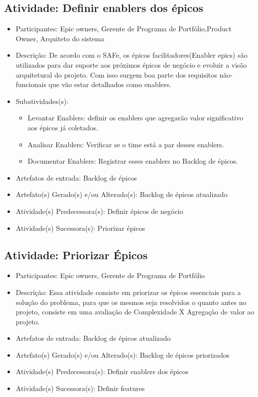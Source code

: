 \subsection{Atividade: Definir enablers dos épicos}
\begin{itemize}
\item Participantes: Epic owners, Gerente de Programa de Portfólio,Product Owner, Arquiteto do sistema

\item Descrição: De acordo com o SAFe, os épicos facilitadores(Enabler epics) são utilizados para dar suporte aos próximos épicos de negócio e evoluir a visão arquitetural do projeto. Com isso surgem boa parte dos requisitos não-funcionais que vão estar detalhados como enablers.

\item Subatividades(s):
	\begin{itemize} 
    \item Levantar Enablers: definir os enablers que agregarão valor significativo aos épicos já coletados.
    \item Analisar Enablers: Verificar se o time está a par desses enablers.
    \item Documentar Enablers:  Registrar esses enablers no Backlog de épicos.
    \end{itemize}
\item Artefatos de entrada: Backlog de épicos

\item Artefato(s) Gerado(s) e/ou Alterado(s): Backlog de épicos atualizado

\item Atividade(s) Predecessora(s): Definir épicos de negócio
  
\item Atividade(s) Sucessora(s): Priorizar épicos
\end{itemize}

\subsection{Atividade: Priorizar Épicos}
\begin{itemize}
\item Participantes: Epic owners, Gerente de Programa de Portfólio

\item Descrição: Essa atividade consiste em priorizar os épicos essenciais para a solução do problema, para que os mesmos seja resolvidos o quanto antes no projeto, consiste em uma avaliação de Complexidade X Agregação de valor ao projeto.

\item Artefatos de entrada: Backlog de épicos atualizado

\item Artefato(s) Gerado(s) e/ou Alterado(s): Backlog de épicos priorizados

\item Atividade(s) Predecessora(s): Definir enablers dos épicos
  
\item Atividade(s) Sucessora(s): Definir features
\end{itemize}

